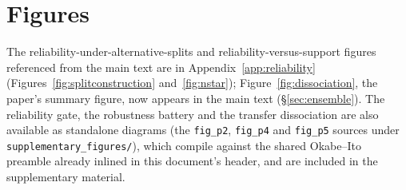 \documentclass{article}
\begin{document}
\section{Figures}
\label{app:figures}

The reliability-under-alternative-splits and reliability-versus-support figures
referenced from the main text are in Appendix~\ref{app:reliability}
(Figures~\ref{fig:splitconstruction} and~\ref{fig:nstar}); Figure~\ref{fig:dissociation},
the paper's summary figure, now appears in the main text (\S\ref{sec:ensemble}).
The reliability gate, the robustness battery and the transfer dissociation are
also available as standalone diagrams (the \texttt{fig\_p2}, \texttt{fig\_p4} and
\texttt{fig\_p5} sources under \texttt{supplementary\_figures/}), which compile against
the shared Okabe--Ito preamble already inlined in this document's header, and are
included in the supplementary material.
\end{document}
